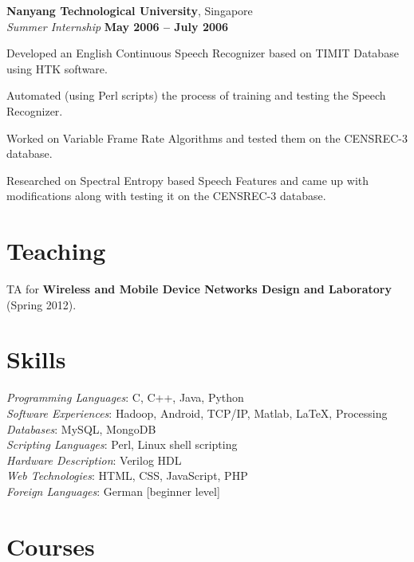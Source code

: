 \documentclass[margin,line]{resume}
\begin{document}
\begin{resume}
    \textbf{Nanyang Technological University}, Singapore \\%
    \textsl{Summer Internship} \hfill \textbf{May 2006 -- July 2006}
    \begin{list2}
    \item Developed an English Continuous Speech Recognizer based on TIMIT Database using HTK software.
    \item Automated (using Perl scripts) the process of training and testing the Speech Recognizer.
    \item Worked on Variable Frame Rate Algorithms and tested them on the CENSREC-3 database.
    \item Researched on Spectral Entropy based Speech Features and came up with modifications along with testing it on the CENSREC-3 database.
    \end{list2}
    

\section{\mysidestyle Teaching}
TA for \textbf{Wireless and Mobile Device Networks Design and Laboratory} (Spring 2012).

 \section{\mysidestyle Skills} 

    \textsl{Programming Languages}: C, C++, Java, Python\\
    \textsl{Software Experiences}: Hadoop, Android, TCP/IP, Matlab, \LaTeX, Processing\\
    \textsl{Databases}: MySQL, MongoDB\\
    \textsl{Scripting Languages}: Perl, Linux shell scripting \\
    \textsl{Hardware Description}: Verilog HDL \\
    \textsl{Web Technologies}: HTML, CSS, JavaScript, PHP \\
    \textsl{Foreign Languages}: German [beginner level]

\newpage

\section{\mysidestyle Courses} 


\end{resume}
\end{document}
